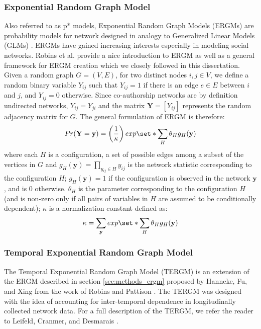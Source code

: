 \subsubsection{Exponential Random Graph Model}
\label{sec:back_ergm}
Also referred to as p* models, Exponential Random Graph Models (ERGMs) are probability models for network designed in analogy to Generalized Linear Models (GLMs) \cite{kolaczyk_statistical_2014}. ERGMs have gained increasing interests especially in modeling social networks. Robins et al. \cite{robins_introduction_2007} provide a nice introduction to ERGM as well as a general framework for ERGM creation which we closely followed in this dissertation. \\
Given a random graph $G=(V,E)$, for two distinct nodes $i,j \in V$, we define a random binary variable $Y_{ij}$ such that $Y_{ij}=1$ if there is an edge $e \in E$ between $i$ and $j$, and $Y_{ij}=0$ otherwise. Since co-authorship networks are by definition undirected networks, $Y_{ij}=Y_{ji}$ and the matrix $\mathbf{Y}=\left[Y_{ij}\right]$ represents the random adjacency matrix for $G$. The general formulation of ERGM is therefore:
\begin{equation}
Pr(\mathbf{Y}=\mathbf{y})=\left( \frac{1}{\kappa} \right) exp \set*{ \sum_{H} \theta_H g_H(\mathbf{y})}
\end{equation}
where each $H$ is a configuration, a set of possible edges among a subset of the vertices in $G$ and $g_H(\mathbf{y})=\prod_{y_{ij} \in H}y_{ij}$ is the network statistic corresponding to the configuration $H$; $g_H(\mathbf{y})=1$ if the configuration is observed in the network $\mathbf{y}$, and is $0$ otherwise. $\theta_H$ is the parameter corresponding to the configuration $H$ (and is non-zero only if all pairs of variables in $H$ are assumed to be conditionally dependent); $\kappa$ is a normalization constant defined as:
\begin{equation}
\kappa = \sum_{\mathbf{y}}exp \set*{ \sum_{H} \theta_H g_H(\mathbf{y})}
\end{equation}

\subsubsection{Temporal Exponential Random Graph Model}
\label{sec:back_tergm}
The Temporal Exponential Random Graph Model (TERGM) is an extension of the ERGM described in section \ref{sec:methods_ergm} proposed by Hanneke, Fu, and Xing \cite{hanneke_discrete_2010} from the work of Robins and Pattison \cite{robins_random_2001}. The TERGM was designed with the idea of accounting for inter-temporal dependence in longitudinally collected network data. For a full description of the TERGM, we refer the reader to Leifeld, Cranmer, and Desmarais \cite{leifeld_temporal_2015}. 

